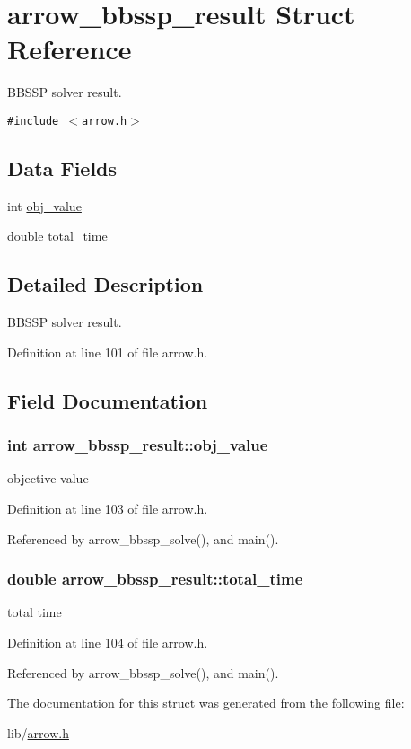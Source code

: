 \hypertarget{structarrow__bbssp__result}{
\section{arrow\_\-bbssp\_\-result Struct Reference}
\label{structarrow__bbssp__result}
}
BBSSP solver result.  


{\tt \#include $<$arrow.h$>$}

\subsection*{Data Fields}
\begin{CompactItemize}
\item 
int \hyperlink{structarrow__bbssp__result_c450e3a1ec60222a26d508adc1001c64}{obj\_\-value}
\item 
double \hyperlink{structarrow__bbssp__result_8bb63054adb7b4dede2d08dc90606559}{total\_\-time}
\end{CompactItemize}


\subsection{Detailed Description}
BBSSP solver result. 

Definition at line 101 of file arrow.h.

\subsection{Field Documentation}
\hypertarget{structarrow__bbssp__result_c450e3a1ec60222a26d508adc1001c64}{
\subsubsection{\setlength{\rightskip}{0pt plus 5cm}int {\bf arrow\_\-bbssp\_\-result::obj\_\-value}}}
\label{structarrow__bbssp__result_c450e3a1ec60222a26d508adc1001c64}


objective value 

Definition at line 103 of file arrow.h.

Referenced by arrow\_\-bbssp\_\-solve(), and main().\hypertarget{structarrow__bbssp__result_8bb63054adb7b4dede2d08dc90606559}{
\subsubsection{\setlength{\rightskip}{0pt plus 5cm}double {\bf arrow\_\-bbssp\_\-result::total\_\-time}}}
\label{structarrow__bbssp__result_8bb63054adb7b4dede2d08dc90606559}


total time 

Definition at line 104 of file arrow.h.

Referenced by arrow\_\-bbssp\_\-solve(), and main().

The documentation for this struct was generated from the following file:\begin{CompactItemize}
\item 
lib/\hyperlink{arrow_8h}{arrow.h}\end{CompactItemize}
